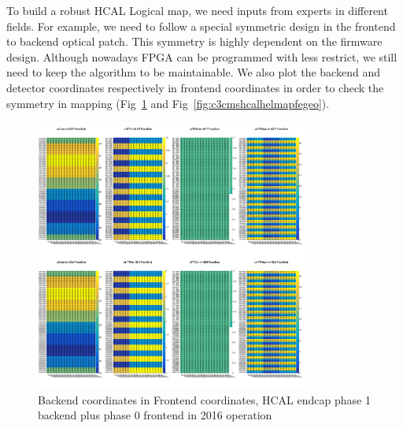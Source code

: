 To build a robust HCAL Logical map, we need inputs from experts in different fields. For example, we need to follow a special symmetric design in the frontend to backend optical patch. This symmetry is highly dependent on the firmware design. Although nowadays FPGA can be programmed with less restrict, we still need to keep the algorithm to be maintainable. We also plot the backend and detector coordinates respectively in frontend coordinates in order to check the symmetry in mapping (Fig~\ref{fig:c3cmshcalhelmapfebe} and Fig~\ref{fig:c3cmshcalhelmapfegeo}).

\begin{figure}[htbp]
 \begin{center}
  \includegraphics[width=0.8\textwidth]{figures/c3/c3_cms_hcalhelmapfebe.png}
 \end{center}
 \caption{Backend coordinates in Frontend coordinates, HCAL endcap phase 1 backend plus phase 0 frontend in 2016 operation}
 \label{fig:c3cmshcalhelmapfebe}
\end{figure}

